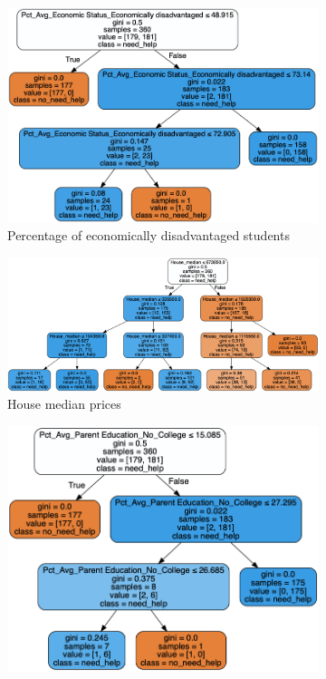 \documentclass[11pt]{article}
\begin{document}
\begin{figure}[h!]
\centering
\begin{subfigure}{0.4\textwidth}
         \centering
         \includegraphics[width=\textwidth]{recom_economic_dis_rate.png}
         \caption{Percentage of economically disadvantaged students}
         \label{fig:dtree_specific_eco_disrate}
\end{subfigure}
\hfill
\begin{subfigure}{0.55\textwidth}
         \centering
         \includegraphics[width=\textwidth]{recom_house_median.png}
         \caption{House median prices}
         \label{fig:dtree_specific_house}
\end{subfigure}
\hfill
\begin{subfigure}{0.45\textwidth}
         \centering
         \includegraphics[width=\textwidth]{recom_edu_notcollege.png}

\end{subfigure}
\end{figure}
\end{document}
